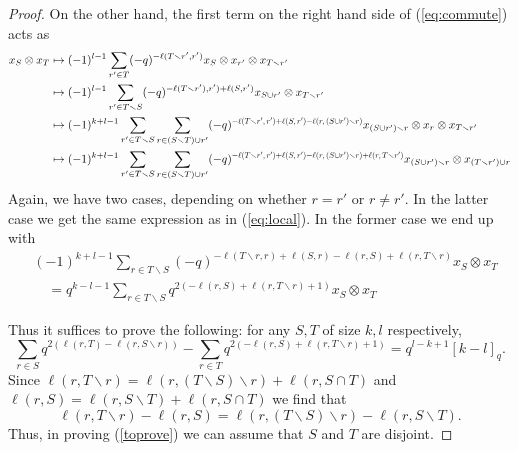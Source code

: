 \documentclass[11pt]{amsart}
\begin{document}
\begin{proof}
On the other hand, the first term on the right hand side of (\ref{eq:commute}) acts as
\begin{align*}
x_S \otimes x_T
&\mapsto (-1)^{l-1} \sum_{r' \in T} (-q)^{-\ell(T \smallsetminus r', r')} x_S \otimes x_{r'} \otimes x_{T \smallsetminus r'} \\
&\mapsto (-1)^{l-1} \sum_{r' \in T \smallsetminus S} (-q)^{-\ell(T \smallsetminus r'), r') + \ell(S,r')} x_{S \cup r'} \otimes x_{T \smallsetminus r'} \\
&\mapsto (-1)^{k+l-1} \sum_{r' \in T \smallsetminus S} \sum_{r \in (S \smallsetminus T) \cup r'} (-q)^{\scalebox{0.7}{$-\ell(T {\smallsetminus} r', r') {+} \ell(S,r') {-} \ell(r, (S {\cup} r') {\smallsetminus} r)$}} x_{(S \cup r') \smallsetminus r} \otimes x_r \otimes x_{T \smallsetminus r'} \\
&\mapsto (-1)^{k+l-1} \sum_{r' \in T \smallsetminus S} \sum_{r \in (S \smallsetminus T) \cup r'} (-q)^{\scalebox{0.7}{$-\ell(T {\smallsetminus} r', r') {+} \ell(S,r') {-} \ell(r, (S {\cup} r') {\smallsetminus} r) {+} \ell(r, T {\smallsetminus} r')$}} x_{(S \cup r') \smallsetminus r} \otimes x_{(T \smallsetminus r') \cup r}
\end{align*}
Again, we have two cases, depending on whether $r = r'$ or $r \ne r'$. In the latter case we get the same expression as in (\ref{eq:local}). In the former case we end up with
\begin{align*}
& (-1)^{k+l-1} \sum_{r \in T \smallsetminus S} (-q)^{-\ell(T \smallsetminus r,r) + \ell(S,r) - \ell(r,S) + \ell(r,T \smallsetminus r)} x_S \otimes x_T \\
& \quad = q^{k-l-1} \sum_{r \in T \smallsetminus S} q^{2( - \ell(r,S) + \ell(r, T \smallsetminus r) +1) } x_S \otimes x_T
\end{align*}

Thus it suffices to prove the following: for any $S,T$ of size $k, l $ respectively,
\begin{equation} \label{toprove}
 \sum_{r \in S} q^{2(\ell(r, T) - \ell(r, S \smallsetminus r))} - \sum_{r \in T} q^{2 (-\ell(r, S) + \ell(r, T \smallsetminus r) + 1)} = q^{l-k+1} [k-l]_q.
\end{equation}
Since $\ell(r, T \smallsetminus r) = \ell(r, (T \smallsetminus S) \smallsetminus r) + \ell(r, S \cap T)$ and $\ell(r,S) = \ell(r, S \smallsetminus T) + \ell(r, S \cap T)$ we find that
$$\ell(r, T \smallsetminus r) - \ell(r,S) = \ell(r, (T \smallsetminus S) \smallsetminus r) - \ell(r, S \smallsetminus T).$$
Thus, in proving (\ref{toprove}) we can assume that $S$ and $T$ are disjoint.


\end{proof}
\end{document}
